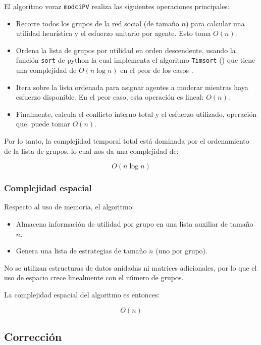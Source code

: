 \documentclass[11pt,letter]{article}
\begin{document}
    El algoritmo voraz \texttt{modciPV} realiza las siguientes operaciones principales:

    \begin{itemize}
        \item Recorre todos los grupos de la red social (de tamaño $n$) para calcular una utilidad heurística y el esfuerzo unitario por agente. Esto toma ${O}(n)$.
        \item Ordena la lista de grupos por utilidad en orden descendente, usando la función \texttt{sort} de python la cual implementa el algoritmo \texttt{Timsort} (\cite{python_sorting}) que tiene una complejidad de ${O}(n \log n)$ en el peor de los casos \cite{Auger2018}.
        \item Itera sobre la lista ordenada para asignar agentes a moderar mientras haya esfuerzo disponible. En el peor caso, esta operación es lineal: ${O}(n)$.
        \item Finalmente, calcula el conflicto interno total y el esfuerzo utilizado, operación que, puede tomar ${O}(n)$.
    \end{itemize}

    Por lo tanto, la complejidad temporal total está dominada por el ordenamiento de la lista de grupos, lo cual nos da una complejidad de:

    \[
            {O}(n \log n)
    \]

    \subsubsection{Complejidad espacial}

    Respecto al uso de memoria, el algoritmo:

    \begin{itemize}
        \item Almacena información de utilidad por grupo en una lista auxiliar de tamaño $n$.
        \item Genera una lista de estrategias de tamaño $n$ (uno por grupo).
    \end{itemize}

    No se utilizan estructuras de datos anidadas ni matrices adicionales, por lo que el uso de espacio crece linealmente con el número de grupos.

    La complejidad espacial del algoritmo es entonces:

    \[
            {O}(n)
    \]

    \subsection{Corrección}
\end{document}
